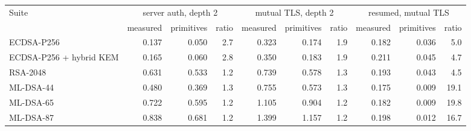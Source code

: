 \begin{tabular}{@{}lrrrrrrrrr@{}}
\toprule
Suite & \multicolumn{3}{c}{server auth, depth 2} & \multicolumn{3}{c}{mutual TLS, depth 2} & \multicolumn{3}{c}{resumed, mutual TLS} \\
\cmidrule(lr){2-4}\cmidrule(lr){5-7}\cmidrule(lr){8-10}
 & measured & primitives & ratio & measured & primitives & ratio & measured & primitives & ratio \\
\midrule
ECDSA-P256 & 0.137 & 0.050 & 2.7 & 0.323 & 0.174 & 1.9 & 0.182 & 0.036 & 5.0 \\
ECDSA-P256 + hybrid KEM & 0.165 & 0.060 & 2.8 & 0.350 & 0.183 & 1.9 & 0.211 & 0.045 & 4.7 \\
RSA-2048 & 0.631 & 0.533 & 1.2 & 0.739 & 0.578 & 1.3 & 0.193 & 0.043 & 4.5 \\
ML-DSA-44 & 0.480 & 0.369 & 1.3 & 0.755 & 0.573 & 1.3 & 0.175 & 0.009 & 19.1 \\
ML-DSA-65 & 0.722 & 0.595 & 1.2 & 1.105 & 0.904 & 1.2 & 0.182 & 0.009 & 19.8 \\
ML-DSA-87 & 0.838 & 0.681 & 1.2 & 1.399 & 1.157 & 1.2 & 0.198 & 0.012 & 16.7 \\
\bottomrule
\end{tabular}
